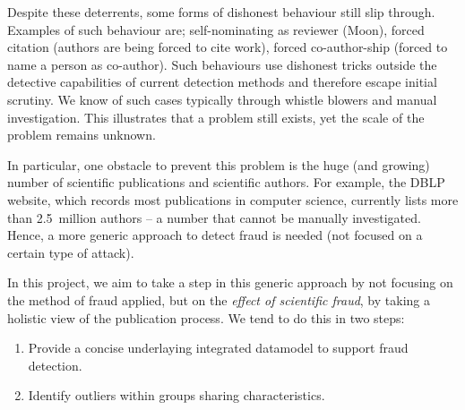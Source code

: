 \documentclass{ou-report}
\newcommand{\HJ}[1]{{\color{red} HJ: #1}}
\newcommand{\todo}[1]{{\color{red} TODO: #1}}
\begin{document}
Despite these deterrents, some forms of dishonest behaviour still slip through.
Examples of such behaviour are;
self-nominating as reviewer (Moon), forced citation (authors are being forced
to cite work), forced co-author-ship (forced to name a person as co-author).
Such behaviours use dishonest tricks outside the detective capabilities of
current detection methods and therefore escape initial scrutiny. We know of
such cases typically through whistle blowers and manual investigation. 
This illustrates that a problem still exists, yet the scale of the
problem remains unknown.

In particular, one obstacle to prevent this problem is the huge (and growing) 
number of scientific 
publications and scientific authors. For example, the DBLP website, which 
records most publications in computer science, currently lists more than 
2.5~million authors -- a number that cannot be manually investigated. Hence, a 
more generic approach to detect fraud is needed (not focused on a certain type
of attack).


In this project, we aim to take a step in this generic approach by not 
focusing on the method of fraud applied, but on the 
\emph{effect of scientific fraud}, by taking a holistic view of the publication 
process. We tend to do this in two steps:
\begin{enumerate}
\item Provide a concise underlaying integrated datamodel to support fraud 
detection.
\item Identify outliers within groups sharing characteristics.
\end{enumerate}
\end{document}
